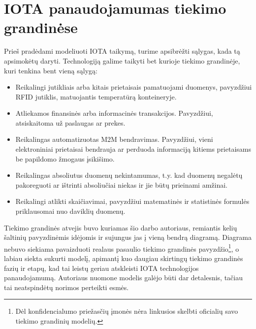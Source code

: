 
\section{IOTA panaudojamumas tiekimo grandinėse}

Prieš pradėdami modeliuoti IOTA taikymą, turime apsibrėžti sąlygas, kada tą apsimokėtų daryti. Technologiją galime taikyti bet kurioje tiekimo grandinėje, kuri tenkina bent vieną sąlygą:
\begin{itemize}
    \item Reikalingi jutikliais arba kitais prietaisais pamatuojami duomenys, pavyzdžiui RFID jutiklis, matuojantis temperatūrą konteineryje.
    \item Atliekamos finansinės arba informacinės transakcijos. Pavyzdžiui, atsiskaitoma už paslaugas ar prekes.
    \item Reikalingas automatizuotas M2M bendravimas. Pavyzdžiui, vieni elektroniniai prietaisai bendrauja ar perduoda informaciją kitiems prietaisams be papildomo žmogaus įsikišimo.
    \item Reikalingas absoliutus duomenų nekintamumas, t.y. kad duomenų negalėtų pakoreguoti ar ištrinti absoliučiai niekas ir jie būtų prieinami amžinai.
    \item Reikalingi atlikti skaičiavimai, pavyzdžiui matematinės ir statistinės formulės priklausomai nuo daviklių duomenų.
\end{itemize}

Tiekimo grandinės atvejis buvo kuriamas šio darbo autoriaus, remiantis kelių šaltinių pavyzdinėmis idėjomis ir sujungus jas į vieną bendrą diagramą. Diagrama nebuvo siekiama pavaizduoti realaus pasaulio tiekimo grandinės pavyzdžio\footnote{Dėl konfidencialumo priežasčių įmonės nėra linkusios skelbti oficialių savo tiekimo grandinių modelių.}, o labiau siekta sukurti modelį, apimantį kuo daugiau skirtingų tiekimo grandinės fazių ir etapų, kad tai leistų geriau atskleisti IOTA technologijos panaudojamumą. Autoriaus nuomone modelis galėjo būti dar detalesnis, tačiau tai neatspindėtų norimos perteikti esmės.




